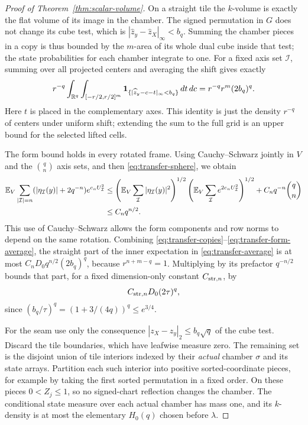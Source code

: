 \begin{proof}[Proof of Theorem~\ref{thm:scalar-volume}]
On a straight tile the \(k\)-volume is exactly the flat volume of
its image in the chamber.  The signed permutation in \(G\) does not
change its cube test, which is
\(|\widehat z_y-\widehat z_X|_\infty<b_q\).  Summing the chamber
pieces in a copy is thus bounded by the \(m\)-area of its whole dual
cube inside that test; the state probabilities for each chamber
integrate to one.  For a fixed axis set \(\mathcal I\), summing over
all projected centers and averaging the shift gives exactly
\begin{equation}\label{eq:transfer-shift}
  r^{-q}\int_{\mathbb R^q}\int_{[-r/2,r/2]^m}
       \mathbf 1_{\{|\widehat z_y-c-t|_\infty<b_q\}}\,dt\,dc
                    =r^{-q}r^m(2b_q)^q.
\end{equation}
Here \(t\) is placed in the complementary axes.  This identity is
just the density \(r^{-q}\) of centers under uniform shift; extending
the sum to the full grid is an upper bound for the selected lifted
cells.

The form bound holds in every rotated frame.  Using Cauchy--Schwarz
jointly in \(V\) and the \(\binom qn\) axis sets, and then
\eqref{eq:transfer-sphere}, we obtain
\begin{equation}\label{eq:transfer-form-average}
 \begin{split}
 \mathbb E_V\sum_{|\mathcal I|=n}
   (|\eta_{\mathcal I}(y)|+2q^{-n})e^{c_nU_{\mathcal I}^2}
 &\leq
   \left(\mathbb E_V\sum_{\mathcal I}|\eta_{\mathcal I}(y)|^2\right)^{1/2}
   \left(\mathbb E_V\sum_{\mathcal I}e^{2c_nU_{\mathcal I}^2}\right)^{1/2}
       +C_nq^{-n}\binom qn\\
 &\leq C_nq^{n/2}.
 \end{split}
\end{equation}
This use of Cauchy--Schwarz allows the form components and row norms
to depend on the same rotation.  Combining
\eqref{eq:transfer-copies}--\eqref{eq:transfer-form-average}, the
straight part of the inner expectation in
\eqref{eq:transfer-average} is at most
\(C_nD_0q^{n/2}(2b_q)^q\), because \(r^{n+m-q}=1\).  Multiplying
by its prefactor \(q^{-n/2}\) bounds that part, for a fixed
dimension-only constant \(C_{{\rm str},n}\), by
\begin{equation}\label{eq:transfer-straight-average}
             C_{{\rm str},n}D_0(2\tau)^q,
\end{equation}
since \((b_q/\tau)^q=(1+3/(4q))^q\leq e^{3/4}\).

For the seam use only the consequence
\(|z_X-z_y|_2\leq b_q\sqrt q\) of the cube test.  Discard the tile
boundaries, which have leafwise measure zero.  The remaining set is
the disjoint union of tile interiors indexed by their \emph{actual}
chamber \(\sigma\) and its state arrays.  Partition each such interior
into positive sorted-coordinate pieces, for example by taking the
first sorted permutation in a fixed order.  On these pieces
\(0<Z_j\leq1\), so no signed-chart reflection changes the chamber.
The conditional state measure over each actual chamber has mass one,
and its \(k\)-density is at most the elementary \(H_0(q)\) chosen
before \(\lambda\).


\end{proof}
